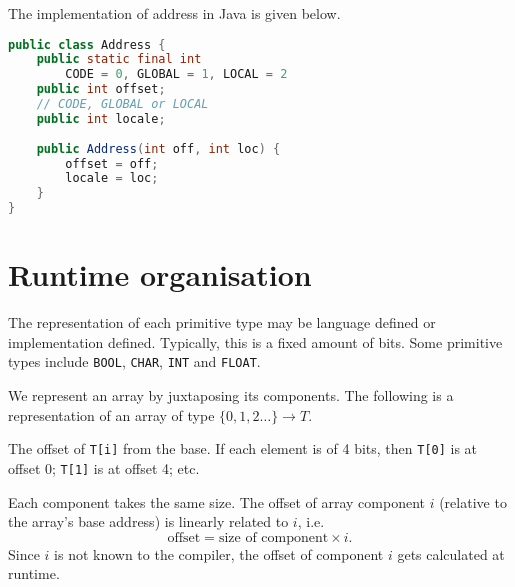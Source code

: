 \documentclass[a4paper, openany]{memoir}
\begin{document}
The implementation of address in Java is given below.
\begin{lstlisting}[language=java]
public class Address {
    public static final int 
        CODE = 0, GLOBAL = 1, LOCAL = 2
    public int offset;
    // CODE, GLOBAL or LOCAL
    public int locale; 
    
    public Address(int off, int loc) {
        offset = off; 
        locale = loc;
    }
}
\end{lstlisting}
\newpage

\section{Runtime organisation}

The representation of each primitive type may be language defined or implementation defined. Typically, this is a fixed amount of bits. Some primitive types include \texttt{BOOL}, \texttt{CHAR}, \texttt{INT} and \texttt{FLOAT}.

We represent an array by juxtaposing its components. The following is a representation of an array of type $\{0, 1, 2 \dots\} \to T$.
\begin{figure}[H]
    \centering
\end{figure}
\noindent The offset of \texttt{T[i]} from the base. If each element is of 4 bits, then \texttt{T[0]} is at offset 0; \texttt{T[1]} is at offset 4; etc.

Each component takes the same size. The offset of array component $i$ (relative to the array's base address) is linearly related to $i$, i.e.
\[\text{offset} = \text{size of component} \times i.\]
Since $i$ is not known to the compiler, the offset of component $i$ gets calculated at runtime.
\end{document}
